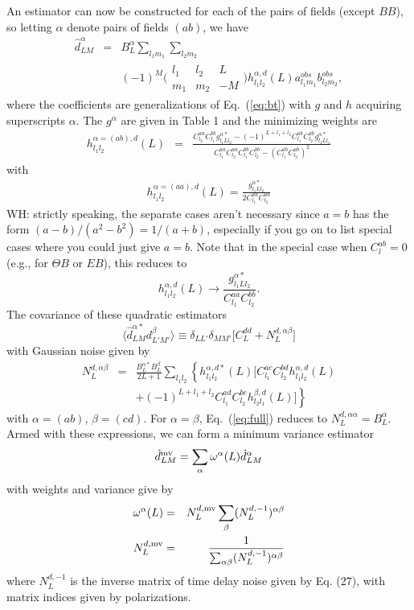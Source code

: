 \documentclass[prl,amsmath,amssymb,floatfix,superscriptaddress,nofootinbib,twocolumn]{revtex4-1}
\def\be{\begin{equation}}
\def\ee{\end{equation}}
\def\bea{\begin{eqnarray}}
\def\eea{\end{eqnarray}}
\newcommand{\ec}[1]{Eq.~(\ref{eq:#1})}
\newcommand{\eql}[1]{\label{eq:#1}}
\newcommand{\wh}[1]{{\color{red} WH: #1}}
\begin{document}
An estimator can now be constructed for each of the pairs of fields (except $BB$), so letting $\alpha$ denote pairs of fields $(ab)$, we have
\bea
\hat{d}^{\alpha}_{LM} &=&\nonumber B_{L}^{\alpha}\sum_{l_{1}m_{1}}\sum_{l_{2}m_{2}} \\
&& (-1)^{M}\bigl(\begin{smallmatrix} l_1 & l_2 & L \\ m_1 & m_2 & -M  \end{smallmatrix}\bigr) h^{\alpha,d}_{l_{1}l_{2}}(L) a^{obs}_{l_{1}m_{1}}b^{obs}_{l_{2}m_{2}} ,
\eea
where the coefficients are generalizations of \ec{bt} with $g$ and $h$ acquiring superscripts $\alpha$. The $g^\alpha$ are given in Table 1 and the minimizing weights are
\bea
h^{\alpha=(ab),d}_{l_{1}l_{2}}(L) 
&=& \frac{C_{l_{2}}^{aa}C_{l_{1}}^{bb}g^{\alpha*}_{l_{1}Ll_{2}}-(-1)^{L+l_{1}+l_{2}}C_{l_{1}}^{ab}C_{l_{2}}^{ab}g^{\alpha*}_{l_{2}Ll_{1}}}{C_{l_{1}}^{aa}C_{l_{2}}^{aa}C_{l_{1}}^{bb}C_{l_{2}}^{bb}-(C_{l_{1}}^{ab}C_{l_{2}}^{ab})^{2}}
\eea
with 
\bea 
h_{l_{1}l_{2}}^{\alpha=(aa),d}(L)= \frac{g_{l_{1}Ll_{2}}^{\alpha*}}{2C_{l_{1}}^{aa}C_{l_{2}}^{aa}}
\eea 
\wh{strictly speaking, the separate cases aren't necessary since $a=b$ has the form $(a-b)/(a^2-b^2) = 1/(a+b)$, especially if you go on to list special cases where you could just give $a=b$.}
Note that in the special case when $C_{l}^{ab}=0$ (e.g., for $\Theta B$ or $EB$), this reduces to 
\be
h^{\alpha,d}_{l_{1}l_{2}}(L) \rightarrow \frac{g^{\alpha *}_{l_{1}Ll_{2}}}{C_{l_{1}}^{aa}C_{l_{2}}^{bb}}. 
\ee
The covariance of these quadratic estimators
\be
\langle \hat{d}^{\alpha*}_{LM}d^{\beta}_{L'M'}\rangle \equiv \delta_{LL'}\delta_{MM'}\big[ C_{L}^{dd}+N_{L}^{d,\alpha \beta} \big]
\ee
with Gaussian noise given by
\bea
N_{L}^{d,\alpha\beta}&=&\frac{B_{L}^{\alpha*}B_{L}^{\beta}}{2L+1}\sum_{l_{1}l_{2}}  \left\{ h_{l_{1}l_{2}}^{\alpha,d*} (L)\big[ C_{l_{1}}^{ac}C_{l_{2}}^{bd}h_{l_{1}l_{2}}^{\alpha,d}(L)\right. \nonumber \\
&&\left. +(-1)^{L+l_{1}+l_{2}}C_{l_{1}}^{ad}C_{l_{2}}^{bc} h_{l_{2}l_{1}}^{\beta,d}(L)  \big]\right\}\eql{full}
\eea
with $\alpha=(ab)$, $\beta=(cd)$. For $\alpha=\beta$, \ec{full} reduces to $N_{L}^{d,\alpha\alpha}=B_{L}^{\alpha}$.
Armed with these expressions, we can form a minimum variance estimator
\be
\hat{d}^{\rm mv}_{LM} = \sum_{\alpha}\omega^{\alpha}(L)\hat{d}^{\alpha}_{LM}
\ee
with weights and variance give by
\bea
\omega^{\alpha}(L) & =&N^{d,\rm mv}_{L} \sum_{\beta}(N_{L}^{d,-1})^{\alpha \beta} \\
N^{d,\rm mv}_{L} &=& \frac{1}{\sum_{\alpha\beta} (N_{L}^{d,-1})^{\alpha \beta}}
\eea
where $N_{L}^{d,-1}$ is the inverse matrix of time delay noise given by Eq. (27), with matrix indices given by polarizations. 
\end{document}
